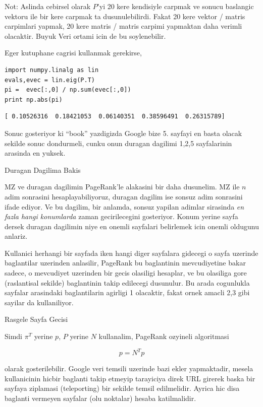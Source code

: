 \documentclass[12pt,fleqn]{article}\usepackage{../common}
\begin{document}
Not: Aslinda cebirsel olarak $P$'yi 20 kere kendisiyle carpmak ve sonucu
baslangic vektoru ile bir kere carpmak ta dusunulebilirdi. Fakat 20 kere
vektor / matris carpimlari yapmak, 20 kere matris / matris carpimi
yapmaktan daha verimli olacaktir. Buyuk Veri ortami icin de bu soylenebilir.

Eger kutuphane cagrisi kullanmak gerekirse, 

\begin{verbatim}
import numpy.linalg as lin
evals,evec = lin.eig(P.T)
pi =  evec[:,0] / np.sum(evec[:,0])
print np.abs(pi)
\end{verbatim}

\begin{verbatim}
[ 0.10526316  0.18421053  0.06140351  0.38596491  0.26315789]
\end{verbatim}

Sonuc gosteriyor ki ``book'' yazdigizda Google bize 5. sayfayi en basta
olacak sekilde sonuc dondurmeli, cunku onun duragan dagilimi 1,2,5
sayfalarinin arasinda en yuksek.

Duragan Dagilima Bakis

MZ ve duragan dagilimin PageRank'le alakasini bir daha dusunelim. MZ ile
$n$ adim sonrasini hesaplayabiliyoruz, duragan dagilim ise sonsuz adim
sonrasini ifade ediyor. Ve bu dagilim, bir anlamda, sonsuz yapilan adimlar
sirasinda {\em en fazla hangi konumlarda} zaman gecirilecegini
gosteriyor. Konum yerine sayfa dersek duragan dagilimin niye en onemli
sayfalari belirlemek icin onemli oldugunu anlariz. 

Kullanici herhangi bir sayfada iken hangi diger sayfalara gidecegi o sayfa
uzerinde baglantilar uzerinden anlasilir, PageRank bu baglantinin
mevcudiyetine bakar sadece, o mevcudiyet uzerinden bir gecis olasiligi
hesaplar, ve bu olasiliga gore (raslantisal sekilde) baglantinin takip
edilecegi dusunulur. Bu arada cogunlukla sayfalar arasindaki baglantilarin
agirligi 1 olacaktir, fakat ornek amacli 2,3 gibi sayilar da kullaniliyor. 

Rasgele Sayfa Gecisi

Simdi $\pi^T$ yerine $p$, $P$ yerine $N$ kullanalim, PageRank ozyineli
algoritmasi 

$$ p = N^Tp $$ 

olarak gosterilebilir. Google veri temsili uzerinde bazi ekler yapmaktadir,
mesela kullanicinin hicbir baglanti takip etmeyip tarayiciya direk URL
girerek baska bir sayfaya ziplamasi (teleporting) bir sekilde temsil
edilmelidir. Ayrica hic disa baglanti vermeyen sayfalar (olu noktalar)
hesaba katilmalidir. 
\end{document}
